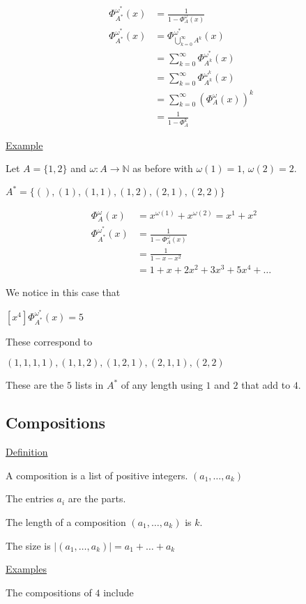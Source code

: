 \documentclass{article}
\begin{document}
\begin{align*}
\Phi_{A^*}^{\omega^*}(x) &= \frac{1}{1- \Phi_{A}^{\omega}(x)} \\
\Phi_{A^*}^{\omega^*}(x) &= \Phi_{\bigcup_{k=0}^{\infty}A^k}^{\omega^*}(x) \\
&= \sum_{k=0}^{\infty}\Phi_{A^k}^{\omega^*}(x) \\
&= \sum_{k=0}^{\infty}\Phi_{A^k}^{\omega^k}(x) \\
&= \sum_{k=0}^{\infty}(\Phi_{A}^{\omega}(x))^k \\
&= \frac{1}{1-\Phi_{A}^{k}}
\end{align*}

\underline{Example}

Let $A = \{1,2\}$ and $\omega:A \to \mathbb{N}$ as before with $\omega(1)=1$, $\omega(2)=2$.

$A^* = \{(),(1),(1,1),(1,2),(2,1),(2,2)\}$

\begin{align*}
\Phi_{A}^{\omega}(x) &= x^{\omega(1)} + x^{\omega(2)} = x^1 + x^2 \\
\Phi_{A^*}^{\omega^*}(x) &= \frac{1}{1-\Phi_{A}^{\omega}(x)} \\
&= \frac{1}{1-x-x^2} \\
&= 1 + x + 2x^2 + 3x^3 + 5x^4 + \ldots
\end{align*}

We notice in this case that

$[x^4]\Phi_{A^*}^{\omega^*}(x) = 5$

These correspond to

$(1,1,1,1),(1,1,2),(1,2,1),(2,1,1),(2,2)$

These are the $5$ lists in $A^*$ of any length using $1$ and $2$ that add to $4$. 

\subsection{Compositions}

\underline{Definition}

A composition is a list of positive integers. $(a_1,\ldots,a_k)$

The entries $a_i$ are the parts.

The length of a composition $(a_1,\ldots,a_k)$ is $k$. 

The size is $|(a_1,\ldots,a_k)| = a_1 + \ldots + a_k$

\underline{Examples}

The compositions of $4$ include
\end{document}
